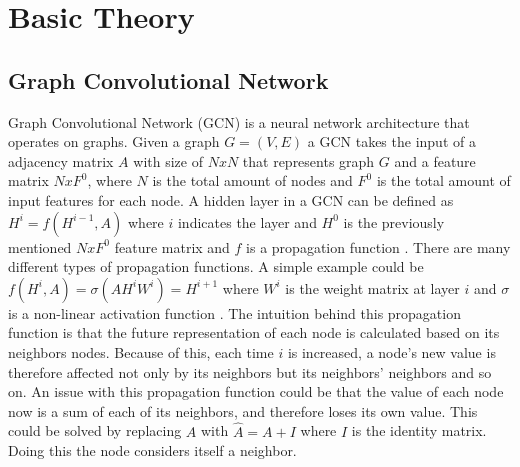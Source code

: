 \section{Basic Theory}



\subsection{Graph Convolutional Network}
Graph Convolutional Network (GCN) is a neural network architecture that operates on graphs.
Given a graph $G = (V,E)$ a GCN takes the input of a adjacency
matrix $A$ with size of $N x N$ that represents graph $G$ and a feature matrix $N x F^0$, where $N$ is the total amount of nodes and $F^0$ is the total amount of input features for each node.
A hidden layer in a GCN can be defined as $H^i = f(H^{i-1}, A)$ where $i$ indicates the layer and $H^0$ is the previously mentioned $N x F^0$ feature matrix and $f$ is a propagation function \cite{Deep-Learning-on-Graphs-with-GCN}.
There are many different types of propagation functions.
A simple example could be $f(H^i, A) = \sigma(AH^iW^i) = H^{i+1}$ where $W^i$ is the weight matrix at layer $i$ and $\sigma$ is a non-linear activation function \cite{Deep-Learning-on-Graphs-with-GCN}.
The intuition behind this propagation function is that the future representation of each node is calculated based on its neighbors nodes.
Because of this, each time $i$ is increased, a node's new value is therefore affected not only by its neighbors but its neighbors' neighbors and so on.
An issue with this propagation function could be that the value of each node now is a sum of each of its neighbors, and therefore loses its own value.
This could be solved by replacing $A$ with $\hat{A} = A + I$ where $I$ is the identity matrix.
Doing this the node considers itself a neighbor.
